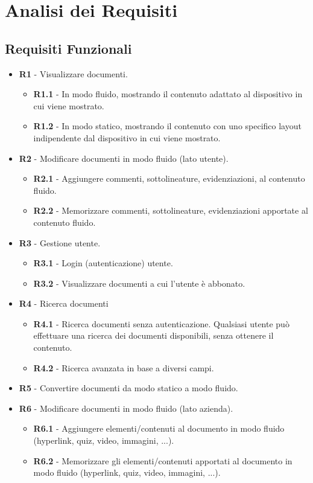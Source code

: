 \section{Analisi dei Requisiti}
\subsection{Requisiti Funzionali}
\begin{itemize}
    \item \textbf{R1} - Visualizzare documenti.
    \begin{itemize}
        \item \textbf{R1.1} - In modo fluido, mostrando il contenuto adattato al dispositivo in cui viene mostrato.
        \item \textbf{R1.2} - In modo statico, mostrando il contenuto con uno specifico layout indipendente dal dispositivo in cui viene mostrato.
    \end{itemize}
    \item \textbf{R2} - Modificare documenti in modo fluido (lato utente).
    \begin{itemize}
        \item \textbf{R2.1} - Aggiungere commenti, sottolineature, evidenziazioni, al contenuto fluido.
        \item \textbf{R2.2} - Memorizzare commenti, sottolineature, evidenziazioni apportate al contenuto fluido.
    \end{itemize}
    \item \textbf{R3} - Gestione utente.
    \begin{itemize}
        \item \textbf{R3.1} - Login (autenticazione) utente.
        \item \textbf{R3.2} - Visualizzare documenti a cui l'utente è abbonato.
    \end{itemize}
    \item \textbf{R4} - Ricerca documenti
    \begin{itemize}
        \item \textbf{R4.1} - Ricerca documenti senza autenticazione. Qualsiasi utente può effettuare una ricerca dei documenti disponibili, senza ottenere il contenuto.
        \item \textbf{R4.2} - Ricerca avanzata in base a diversi campi. %
    \end{itemize}
    \item \textbf{R5} - Convertire documenti da modo statico a modo fluido.
    \item \textbf{R6} - Modificare documenti in modo fluido (lato azienda).
    \begin{itemize}
        \item \textbf{R6.1} - Aggiungere elementi/contenuti al documento in modo fluido (hyperlink, quiz, video, immagini, ...). %
        \item \textbf{R6.2} - Memorizzare gli elementi/contenuti apportati al documento in modo fluido (hyperlink, quiz, video, immagini, ...).
    \end{itemize}
\end{itemize}

